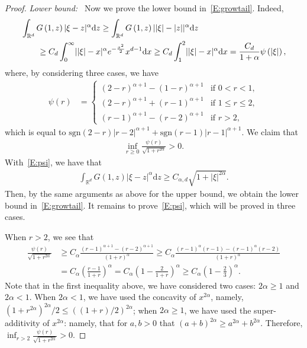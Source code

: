 \documentclass[sn-mathphys]{sn-jnl}%
\newcommand{\BR}{\mathbb{R}}
\newcommand{\ud}{\ensuremath{\mathrm{d}}}
\numberwithin{equation}{section}
\theoremstyle{thmstyleone}%
\theoremstyle{thmstyletwo}%
\theoremstyle{thmstylethree}%
\begin{document}
\begin{proof}
  \noindent\textit{Lower bound:~} Now we prove the lower bound in~\eqref{E:growtail}. Indeed,
  \begin{align*}
    \MoveEqLeft \int_{\BR^d}G\left(1,z\right) \lvert \xi-z \rvert^\alpha \ud z
      \ge \int_{\BR^d}G\left(1,z\right) \lvert \lvert\xi\rvert - \lvert z \rvert \rvert^\alpha \ud z \\
    & \ge {C_d} \int_0^\infty \lvert \lvert\xi\rvert - x \rvert^\alpha e^{-\frac{x^2}{2}}x^{d-1}\ud x
      \ge C_d \int_1^2 \lvert \lvert\xi\rvert - x \rvert^\alpha \ud x
      = \frac{C_d}{1+\alpha} \psi\left(\lvert\xi\rvert\right),
  \end{align*}
  where, by considering three cases, we have
  \begin{align*}
    \psi(r)
    & =
    \begin{cases}
      (2-r)^{\alpha+1} - (1-r)^{\alpha+1} & \text{if $0<r<1$},        \\
      (2-r)^{\alpha+1} + (r-1)^{\alpha+1} & \text{if $1\le r \le 2$}, \\
      (r-1)^{\alpha+1} - (r-2)^{\alpha+1} & \text{if $r > 2$},
    \end{cases}
  \end{align*}
  which is equal to $\text{sgn}(2-r)\lvert r-2 \rvert^{\alpha+1} + \text{sgn}(r-1) \lvert r-1 \rvert^{\alpha+1}$.
  We claim that
  \begin{align}\label{E:psi}
    \inf_{r\ge 0} \frac{\psi(r)}{\sqrt{1+r^{2\alpha}}}>0.
  \end{align}
  With~\eqref{E:psi}, we have that
  \begin{align*}
    \int_{\BR^d}G\left(1,z\right) \lvert \xi-z \rvert^\alpha \ud z \ge C_{\alpha, d} \sqrt{1+\lvert\xi\rvert^{2\alpha}}.
  \end{align*}
  Then, by the same arguments as above for the upper bound, we obtain the lower bound
  in~\eqref{E:growtail}. It remains to prove~\eqref{E:psi}, which will be proved in three cases.

  When $r>2$, we see that
  \begin{align*}
    \frac{\psi(r)}{\sqrt{1+r^{2\alpha}}}
    & \ge C_\alpha \frac{(r-1)^{\alpha+1}-(r-2)^{\alpha+1}}{(1+r)^\alpha}
      \ge C_\alpha \frac{(r-1)^{\alpha}(r-1)-(r-1)^{\alpha}(r-2)}{(1+r)^\alpha} \\
    & = C_\alpha \left(\frac{r-1}{1+r}\right)^\alpha
      = C_\alpha \left(1-\frac{2}{1+r}\right)^\alpha \ge C_\alpha \left(1-\frac{2}{3}\right)^\alpha.
  \end{align*}
  Note that in the first inequality above, we have considered two cases: $2\alpha \ge 1$ and $2
  \alpha < 1$. When $2\alpha < 1$, we have used the concavity of $x^{2\alpha}$, namely, $ (1 +
  r^{2\alpha})^{2\alpha} / 2 \le ((1+r)/2)^{2\alpha}$; when $2\alpha \ge 1$, we have used the
  super-additivity of $x^{2\alpha}$: namely, that for $a,b>0$ that $ (a+b)^{2\alpha}\ge a^{2\alpha}
  + b^{2\alpha}$. Therefore, $\inf_{r>2} \frac{\psi(r)}{\sqrt{1+r^{2\alpha}}} >0$.


\end{proof}
\end{document}
